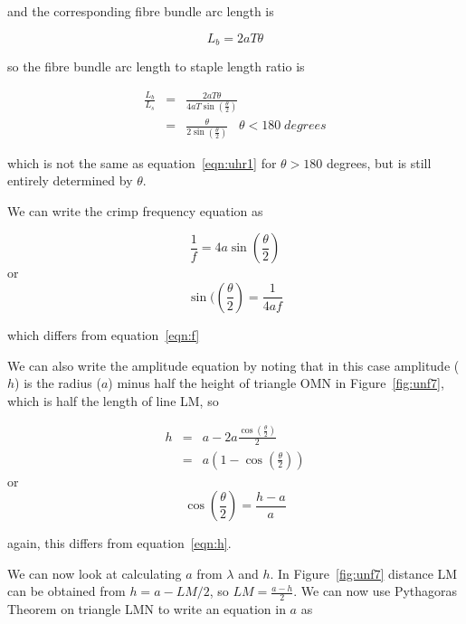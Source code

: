 \documentclass[titlepage,10pt]{article}  %
\begin{document}
and the corresponding fibre bundle arc length is

\begin{displaymath}
L_{b} = 2aT \theta 
\end{displaymath}

so the fibre bundle arc length to staple length ratio is 

\begin{eqnarray}
\label{eqn:uhr2}
\frac{L_{b}}{L_{s}} & = & \frac{2aT \theta}{4a T \sin\left(\frac{\theta}{2}\right)} \nonumber \\
                  & = & \frac{\theta}{2 \sin\left(\frac{\theta}{2}\right)}  
                  \; \; \; \theta < 180 \; degrees
\end{eqnarray}

which is not the same as equation~\ref{eqn:uhr1} for $\theta > 180$ degrees, but is still entirely determined by $\theta$.

We can write the crimp frequency equation as 

\begin{displaymath}
 \frac{1}{f} = 4 a \sin\left(\frac{\theta}{2}\right)
\end{displaymath}
or
\begin{equation}
\label{eqn:f2}
\sin(\left(\frac{\theta}{2}\right) = \frac{1}{4af}
\end{equation}

which differs from equation~\ref{eqn:f}

We can also write the amplitude equation by noting that in this case amplitude ($h$) is the radius ($a$) minus half the height of triangle OMN in Figure~\ref{fig:unf7}, which is half the length of line LM, so

\begin{eqnarray*}
h & = & a  - 2a\frac{\cos\left(\frac{\theta}{2}\right)}{2} \\
  & = & a \left( 1 - \cos\left(\frac{\theta}{2}\right) \right)
\end{eqnarray*}
or
\begin{equation}
\label{eqn:h2}
\cos\left(\frac{\theta}{2}\right) = \frac{h-a}{a}
\end{equation}

again, this differs from equation~\ref{eqn:h}.

We can now look at calculating $a$ from $\lambda$ and $h$. In Figure~\ref{fig:unf7} distance LM can be obtained from $h = a - LM/2$, so $LM = \frac{a-h}{2}$. We can now use Pythagoras Theorem on triangle LMN to write an  equation in $a$ as
\end{document}

